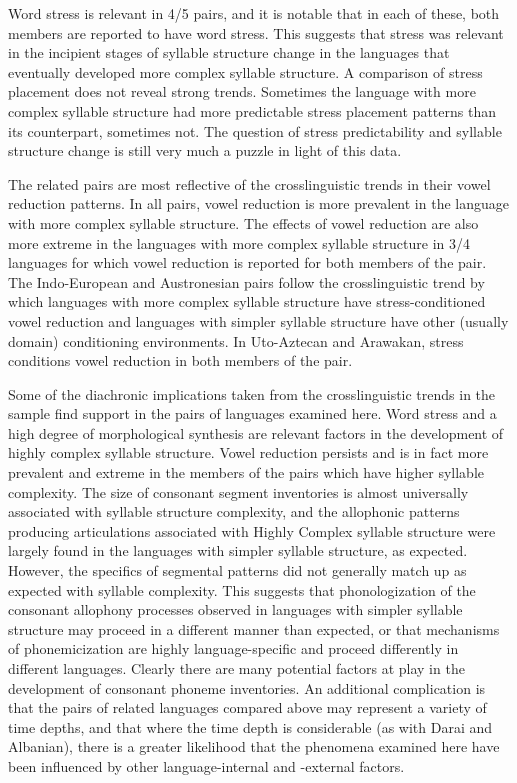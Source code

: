   Word stress is relevant in 4/5 pairs, and it is notable that in each of these, both members are reported to have word stress. This suggests that stress was relevant in the incipient stages of syllable structure change in the languages that eventually developed more complex syllable structure. A comparison of stress placement does not reveal strong trends. Sometimes the language with more complex syllable structure had more predictable stress placement patterns than its counterpart, sometimes not. The question of stress predictability and syllable structure change is still very much a puzzle in light of this data.

  The related pairs are most reflective of the crosslinguistic trends in their vowel reduction patterns. In all pairs, vowel reduction is more prevalent in the language with more complex syllable structure. The effects of vowel reduction are also more extreme in the languages with more complex syllable structure in 3/4 languages for which vowel reduction is reported for both members of the pair. The Indo-European and Austronesian pairs follow the crosslinguistic trend by which languages with more complex syllable structure have stress-conditioned vowel reduction and languages with simpler syllable structure have other (usually domain) conditioning environments. In Uto-Aztecan and Arawakan, stress conditions vowel reduction in both members of the pair.

  Some of the diachronic implications taken from the crosslinguistic trends in the sample find support in the pairs of languages examined here. Word stress and a high degree of morphological synthesis are relevant factors in the development of highly complex syllable structure. Vowel reduction persists and is in fact more prevalent and extreme in the members of the pairs which have higher syllable complexity. The size of consonant segment inventories is almost universally associated with syllable structure complexity, and the allophonic patterns producing articulations associated with Highly Complex syllable structure were largely found in the languages with simpler syllable structure, as expected. However, the specifics of segmental patterns did not generally match up as expected with syllable complexity. This suggests that phonologization of the consonant allophony processes observed in languages with simpler syllable structure may proceed in a different manner than expected, or that mechanisms of phonemicization are highly language-specific and proceed differently in different languages. Clearly there are many potential factors at play in the development of consonant phoneme inventories. An additional complication is that the pairs of related languages compared above may represent a variety of time depths, and that where the time depth is considerable (as with Darai and Albanian), there is a greater likelihood that the phenomena examined here have been influenced by other language-internal and -external factors.

